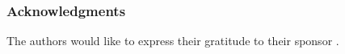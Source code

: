 \documentclass{article}
\begin{document}
%
%

\subsubsection*{Acknowledgments}

The authors would like to express their gratitude to their sponsor .






%
%
%
%
\end{document}
